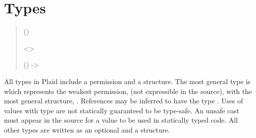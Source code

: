 \section{Types}

\begin{quote}


 {}

 {} 

 {} 

 ()


 {}

 {}

 {}


 {} <>

 {}


 {} 


 {} () %
	-> 


 {}

 {} 


{ {} }
\end{quote}

All types in Plaid include a permission and a structure.  The most general
type is  which represents the weakest
permission,  (not expressible in the source), with the most 
general structure, . References may be inferred to have the
type .  Uses of values with type  are not statically
guaranteed to be type-safe.  An unsafe cast must appear in the source
for a  value to be used in statically typed code. 
All other types are written as an optional  and a structure.

